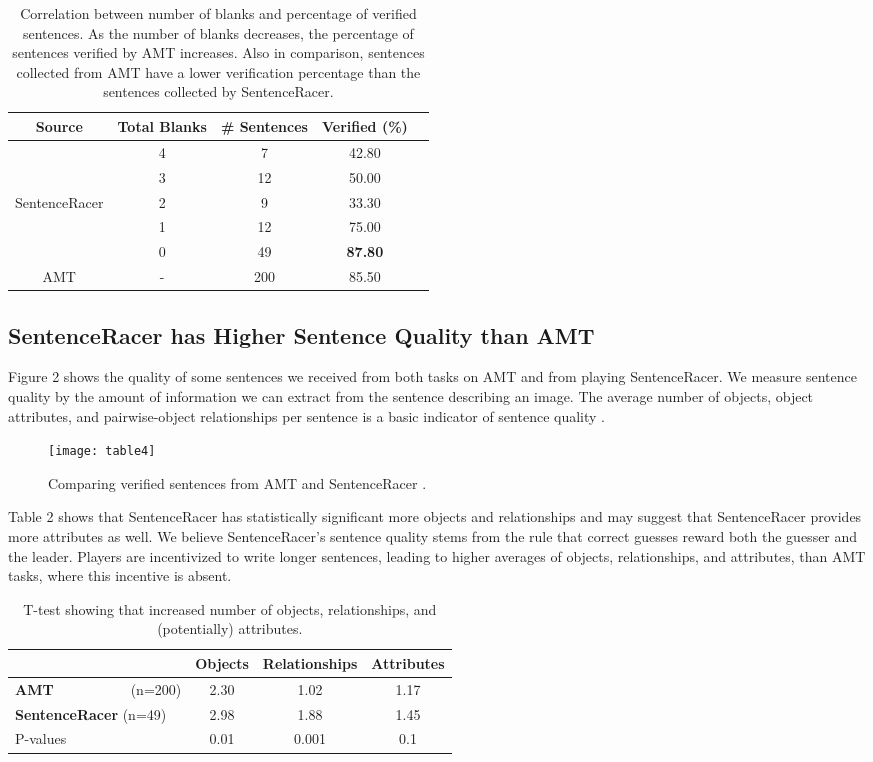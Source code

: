 \documentclass[preprint]{sigchi}
\begin{document}
\begin{table}[h!]
\centering
\begin{tabular}{|c|c|c|c|c|}
\hline
Source & Total Blanks & \# Sentences & Verified (\%) \\ \hline
& 4 & 7 & 42.80 \\
& 3 & 12 & 50.00 \\
SentenceRacer & 2 & 9 & 33.30 \\
& 1 & 12 & 75.00 \\
& 0 & 49 & \textbf{87.80} \\ \hline \hline
AMT & - & 200 & 85.50 \\ \hline
\end{tabular}
\caption{Correlation between number of blanks and percentage of verified sentences. As the number of blanks decreases, the percentage of sentences verified by AMT increases. Also in comparison, sentences collected from AMT have a lower verification percentage than the sentences collected by SentenceRacer.}
\end{table}

\subsection{SentenceRacer has Higher Sentence Quality than AMT}


Figure 2 shows the quality of some sentences we received from both tasks on AMT and from playing SentenceRacer. We measure sentence quality by the amount of information we can extract from the sentence describing an image. The average number of objects, object attributes, and pairwise-object relationships per sentence is a basic indicator of sentence quality \cite{scenegraph}. 
\begin{figure}[h!]
\centering
\texttt{[image: table4]}
\caption{Comparing verified sentences from AMT and SentenceRacer .} 
\label{fig-example}
\end{figure}
Table 2 shows that SentenceRacer has statistically significant more objects and relationships and may suggest that SentenceRacer provides more attributes as well. We believe SentenceRacer's sentence quality stems from the rule that correct guesses reward both the guesser and the leader. Players are incentivized to write longer sentences, leading to higher averages of objects, relationships, and attributes, than AMT tasks, where this incentive is absent.

\begin{table}[h!]
\centering
\begin{tabular}{|C{2.5cm}|c|c|c|}
  \hline
& Objects & Relationships & Attributes\\ \hline
\textbf{AMT}\ \ \ \ \ \ \ \ \ \ \ (n=200) & 2.30 & 1.02 & 1.17 \\ \hline
\textbf{SentenceRacer} (n=49) & 2.98 & 1.88 & 1.45 \\ \hline
P-values &  0.01 &  0.001 & 0.1 \\ \hline
\end{tabular}
\caption{T-test showing that increased number of objects, relationships, and (potentially) attributes.}
\end{table}
\end{document}

